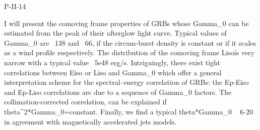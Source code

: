 P-II-14


\bigskip



\bigskip

\noindent I will present the comoving frame properties of GRBs whose Gamma_0 can be estimated from the peak of their afterglow light curve. Typical values of Gamma_0 are ~138 and ~66, if the circum-burst density is constant or if it scales as a wind profile respectively. The distribution of the comoving frame Liso\' is very narrow  with a typical value ~5e48 erg/s. Intriguingly, there exist tight correlations between Eiso or Liso and Gamma_0 which offer a general interpretation scheme for the spectral--energy correlation of GRBs: the Ep-Eiso and Ep-Liso correlations are due to a sequence of Gamma_0 factors. The collimation-corrected correlation, can be explained  if theta^2*Gamma_0=constant. Finally, we find a typical theta*Gamma_0 ~ 6-20 in agreement with magnetically accelerated jets models.

